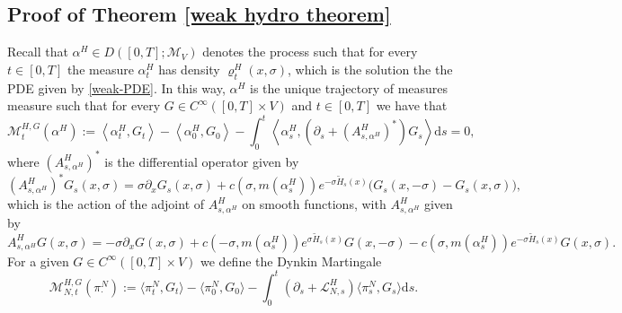 \documentclass[11pt]{article}
\numberwithin{equation}{section}
\theoremstyle{definition}
\theoremstyle{plain}
\newcommand{\dd}{\mathrm{d}}
\begin{document}
\subsection{Proof of Theorem \eqref{weak hydro theorem}}
Recall that $\alpha^H \in D([0,T];\mathcal{M}_V)$ denotes the process such that for every $t\in [0,T]$ the measure $\alpha^H_t$ has density  $\varrho^H_t(x,\sigma)$, which is the solution the the PDE given by \eqref{weak-PDE}.
In this way, $\alpha^H$ is the unique trajectory of measures measure such that for every $G \in C^\infty([0,T]\times V)$ and $t\in[0,T]$ we have that 
    \begin{equation}
        \mathscr{M}_t^{H,G}(\alpha^H) := \left<\alpha^H_t,G_t\right> - \left<\alpha^H_0,G_0\right>  - \int_0^t \left<\alpha^H_s, \left(\partial_s + \left(\!A^{H}_{s, \alpha^H}\!\right)^{\!*}\right) G_s\right>  \dd s = 0,
    \end{equation}
where $ \left(\!A^{H}_{s, \alpha^H}\!\right)^{\!*}$ is the differential operator given by 
    \begin{equation}
        \left(\!A^{H}_{s, \alpha^H}\!\right)^{\!*} G_s(x,\sigma) = \sigma \partial_x G_s(x,\sigma) + c(\sigma,m(\alpha^H_s))e^{-\sigma \widetilde{H}_s(x)}\big(G_s(x,-\sigma) - G_s(x,\sigma)\big), 
    \end{equation}
which is the action of the adjoint of $A^{H}_{s,\alpha^H}$ on smooth functions, with $A^{H}_{s,\alpha^H}$ given by
    \begin{equation}
         A^{H}_{s,\alpha^H}G(x,\sigma) =  -\sigma \partial_x G(x,\sigma) + c(-\sigma,m(\alpha^H_s))e^{\sigma \widetilde{H}_s(x)}G(x,-\sigma) - c(\sigma,m(\alpha^H_s))e^{-\sigma \widetilde{H}_s(x)}G (x,\sigma).
    \end{equation}
For a given $G \in C^\infty([0,T]\times V)$ we define the Dynkin Martingale
    \begin{equation}
        \mathscr{M}_{N,t}^{H,G} (\pi^N_{\cdot}) := \langle \pi^N_{t},G_t\rangle  - \langle \pi^N_{0},G_0\rangle  - \int_0^t (\partial_s +\mathscr{L}^H_{N,s} )\langle \pi^N_{s},G_s\rangle \dd s.
    \end{equation}
\end{document}

